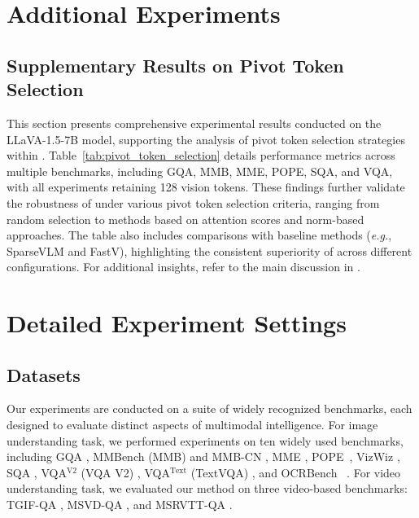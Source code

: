 \appendix
\section{Additional Experiments}

\subsection{Supplementary Results on Pivot Token Selection}\label{app:pivot_selection}
This section presents comprehensive experimental results conducted on the LLaVA-1.5-7B model, supporting the analysis of pivot token selection strategies within \algname. Table~\ref{tab:pivot_token_selection} details performance metrics across multiple benchmarks, including GQA, MMB, MME, POPE, SQA, and VQA, with all experiments retaining 128 vision tokens. These findings further validate the robustness of \algname under various pivot token selection criteria, ranging from random selection to methods based on attention scores and norm-based approaches. The table also includes comparisons with baseline methods (\emph{e.g.}, SparseVLM and FastV), highlighting the consistent superiority of \algname across different configurations. For additional insights, refer to the main discussion in .
% 

% 

\section{Detailed Experiment Settings}\label{app:detailed_experiment_settings}
\subsection{Datasets}
\label{app:dataset}
Our experiments are conducted on a suite of widely recognized benchmarks, each designed to evaluate distinct aspects of multimodal intelligence.
For image understanding task, we performed experiments on ten widely used benchmarks, including GQA \citep{hudson2019gqa}, MMBench (MMB) and MMB-CN \citep{liu2025mmbench}, MME \citep{fu2023mme}, POPE~\citep{li2023evaluating}, VizWiz \citep{bigham2010vizwiz}, SQA \citep{lu2022learn}, VQA$^{\text{V2}}$ (VQA V2) \citep{goyal2017making}, VQA$^{\text{Text}}$ (TextVQA) \citep{singh2019towards}, and OCRBench ~\citep{liu2024ocrbench}.
For video understanding task, we evaluated our method on three video-based benchmarks: TGIF-QA \citep{jang2017tgif}, MSVD-QA \citep{xu2017video}, and MSRVTT-QA \citep{xu2017video}.

